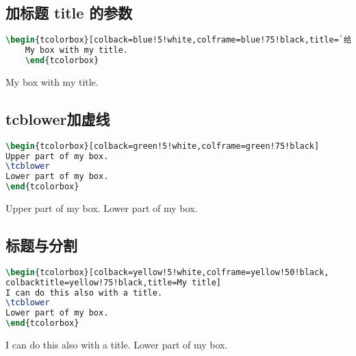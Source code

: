 \documentclass{ctexart}
\begin{document}
\subsection{加标题 title 的参数}
\begin{lstlisting}[language={TeX}]
	\begin{tcolorbox}[colback=blue!5!white,colframe=blue!75!black,title=`给框加标题`]
	My box with my title.
	\end{tcolorbox}
\end{lstlisting}
	\begin{tcolorbox}[colback=blue!5!white,colframe=blue!75!black,title=`给框加标题`]
		My box with my title.
	\end{tcolorbox}

\subsection{tcblower加虚线}
\begin{lstlisting}[language={TeX}]
\begin{tcolorbox}[colback=green!5!white,colframe=green!75!black]
Upper part of my box.
\tcblower
Lower part of my box.
\end{tcolorbox}
\end{lstlisting}
\begin{tcolorbox}[colback=green!5!white,colframe=green!75!black]
	Upper part of my box.
	\tcblower
	Lower part of my box.
\end{tcolorbox}

\subsection{标题与分割}
\begin{lstlisting}[language={TeX}]
\begin{tcolorbox}[colback=yellow!5!white,colframe=yellow!50!black,
colbacktitle=yellow!75!black,title=My title]
I can do this also with a title.
\tcblower
Lower part of my box.
\end{tcolorbox}
\end{lstlisting}
\begin{tcolorbox}[colback=yellow!5!white,colframe=yellow!50!black,
	colbacktitle=yellow!75!black,title=My title]
	I can do this also with a title.
	\tcblower
	Lower part of my box.
\end{tcolorbox}
\end{document}
